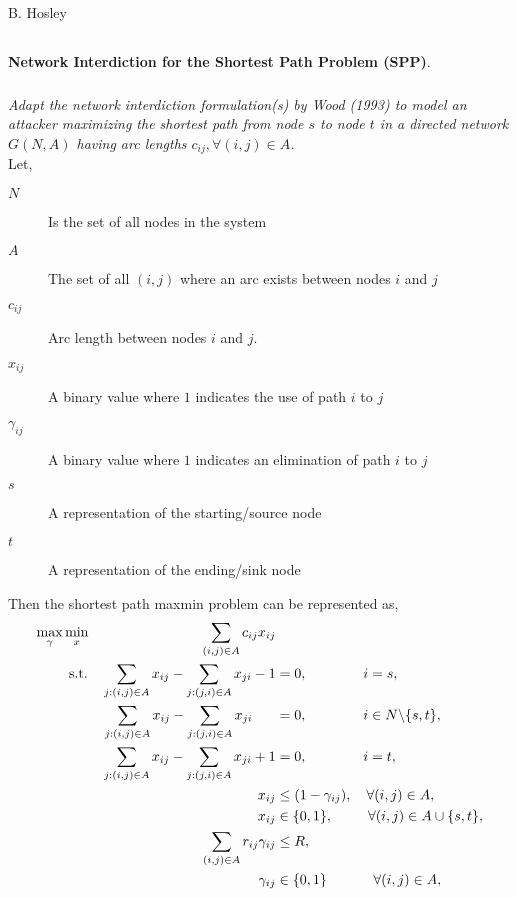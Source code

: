 \documentclass[12pt]{amsart}
\begin{document}
\raggedbottom

\hspace{\fill} {\large B. Hosley}
\bigskip


\setcounter{subsection}{0}
\subsection{}
\textbf{Network Interdiction for the Shortest Path Problem (SPP)}.

\subsubsection{}
\textit{Adapt the network interdiction formulation(s) by Wood (1993) to model an attacker
	maximizing the shortest path from node $s$ to node $t$ in a directed network $G(N, A)$
	having arc lengths $c_{ij}, ∀ (i, j) \in A$.} \\

	Let,
	\begin{description}
		\item[$N$] Is the set of all nodes in the system
		\item[$A$] The set of all $(i,j)$ where an arc exists between nodes $i$ and $j$
		\item[$c_{ij}$] Arc length between nodes $i$ and $j$.
		\item[$x_{ij}$] A binary value where $1$ indicates the use of path $i$ to $j$
		\item[$\gamma_{ij}$] A binary value where $1$ indicates an elimination of path $i$ to $j$
		\item[$s$]  A representation of the starting/source node
		\item[$t$]  A representation of the ending/sink node
	\end{description}

	Then the shortest path maxmin problem can be represented as,
	\begin{align*}
		\max_\gamma\min_x \hspace{8em} \sum_{(i,j)\in A} c_{ij}x_{ij}& \\
		\text{s.t.}\quad
		\sum_{j:(i,j)\in A}x_{ij} - \sum_{j:(j,i)\in A}x_{ji} -1 &= 0, \qquad\qquad i=s, \\
		\sum_{j:(i,j)\in A}x_{ij} - \sum_{j:(j,i)\in A}x_{ji}\ \quad\ &= 0, \qquad\qquad i\in N\backslash \{s,t\}, \\
		\sum_{j:(i,j)\in A}x_{ij} - \sum_{j:(j,i)\in A}x_{ji} +1 &= 0, \qquad\qquad i=t, \\
		x_{ij} &\leq (1- \gamma_{ij}), \quad \forall(i,j) \in A, \\
		x_{ij} &\in \{0,1\}, \hspace{2.5em} \forall(i,j)\in A\cup \{s,t\}, \\
		\sum_{(i,j)\in A} r_{ij}\gamma_{ij} &\leq R, \\
		\gamma_{ij} &\in \{0,1\}\ \qquad\quad \forall(i,j) \in A,
	\end{align*}
\end{document}
